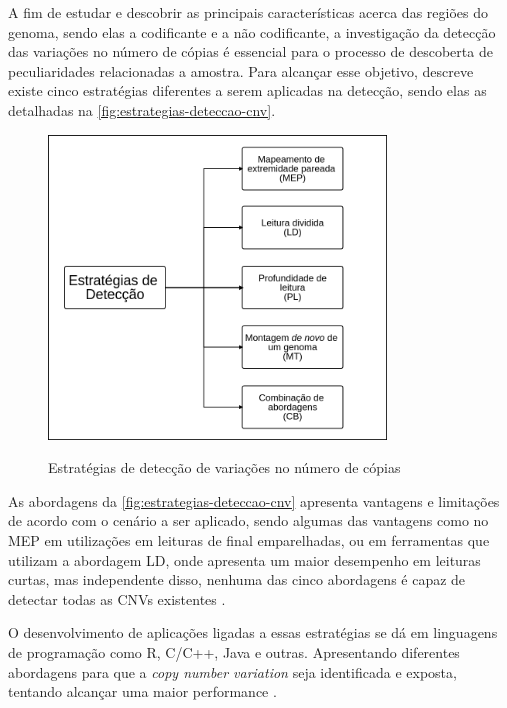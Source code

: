 A fim de estudar e descobrir as principais características acerca das regiões do genoma, sendo elas a codificante e a não codificante, a investigação da detecção das variações no número de cópias é essencial para o processo de descoberta de peculiaridades relacionadas a amostra. Para alcançar esse objetivo, \cite{Zhao2013} descreve existe cinco estratégias diferentes a serem aplicadas na detecção, sendo elas as detalhadas na \autoref{fig:estrategias-deteccao-cnv}.

\begin{figure}[!htb]
    \centering
    \caption{Estratégias de detecção de variações no número de cópias}
    \includegraphics[width=0.8\textwidth]{./dados/figuras/estrategias-deteccao-cnv}
    \label{fig:estrategias-deteccao-cnv}
\end{figure}

As abordagens da \autoref{fig:estrategias-deteccao-cnv} apresenta vantagens e limitações de acordo com o cenário a ser aplicado, sendo algumas das vantagens como no MEP em utilizações em leituras de final emparelhadas, ou em ferramentas que utilizam a abordagem LD, onde apresenta um maior desempenho em leituras curtas, mas independente disso, nenhuma das cinco abordagens é capaz de detectar todas as CNVs existentes \cite{Zhao2013}. 

O desenvolvimento de aplicações ligadas a essas estratégias se dá em linguagens de programação como R, C/C++, Java e outras. Apresentando diferentes abordagens para que a \textit{copy number variation} seja identificada e exposta, tentando alcançar uma maior performance \cite{Zhao2013}. 

